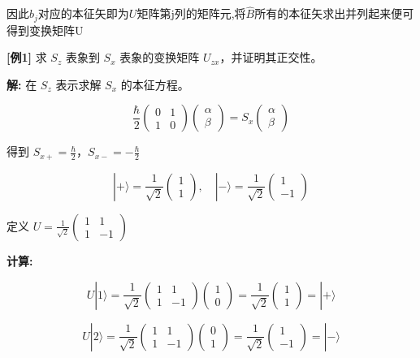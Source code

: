 \documentclass[lang=cn,10pt]{elegantbook}
\begin{document}
\begin{enumerate}
	因此$b_j$对应的本征矢即为$U$矩阵第j列的矩阵元,将$\hat{B}$所有的本征矢求出并列起来便可得到变换矩阵U
	
		\textbf{[例1]} 求 $S_z$ 表象到 $S_x$ 表象的变换矩阵 $U_{zx}$，并证明其正交性。
	
	\textbf{解:} 在 $S_z$ 表示求解 $S_x$ 的本征方程。
	
	\[
		\frac{\hbar}{2} \begin{pmatrix} 0 & 1 \\ 1 & 0 \end{pmatrix} \begin{pmatrix} \alpha \\ \beta \end{pmatrix} = S_x \begin{pmatrix} \alpha \\ \beta \end{pmatrix}
	\]
	
		得到 $S_{x+} = \frac{\hbar}{2}$，$S_{x-} = -\frac{\hbar}{2}$
	
	\[
	| + \rangle = \frac{1}{\sqrt{2}} \begin{pmatrix} 1 \\ 1 \end{pmatrix}, \quad | - \rangle = \frac{1}{\sqrt{2}} \begin{pmatrix} 1 \\ -1 \end{pmatrix}
	\]
	
		定义 $U = \frac{1}{\sqrt{2}} \begin{pmatrix} 1 & 1 \\ 1 & -1 \end{pmatrix}$
	
	\textbf{计算:}
	
	\[
		U | 1 \rangle = \frac{1}{\sqrt{2}} \begin{pmatrix} 1 & 1 \\ 1 & -1 \end{pmatrix} \begin{pmatrix} 1 \\ 0 \end{pmatrix} = \frac{1}{\sqrt{2}} \begin{pmatrix} 1 \\ 1 \end{pmatrix} = | + \rangle
	\]
	
	\[
		U | 2 \rangle = \frac{1}{\sqrt{2}} \begin{pmatrix} 1 & 1 \\ 1 & -1 \end{pmatrix} \begin{pmatrix} 0 \\ 1 \end{pmatrix} = \frac{1}{\sqrt{2}} \begin{pmatrix} 1 \\ -1 \end{pmatrix} = | - \rangle
	\]
	

\end{enumerate}
\end{document}
